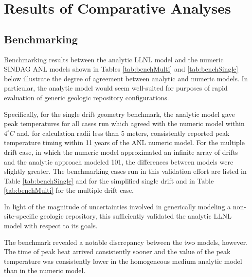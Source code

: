 \documentclass{article}
\begin{document}
\section{Results of Comparative Analyses}

\subsection{Benchmarking}

Benchmarking results between the analytic \gls{LLNL} model and the numeric 
\gls{SINDAG} \gls{ANL} models shown in Tables \ref{tab:benchMulti} and 
\ref{tab:benchSingle} below illustrate the degree of agreement between analytic 
and numeric models. In particular, the analytic model would seem well-suited for 
purposes of rapid evaluation of generic geologic repository configurations. 

Specifically, for the single drift geometry benchmark, the 
analytic model gave peak temperatures for all cases run which agreed with the 
numeric model within $4^{\circ}C$ and, for calculation radii less than 5 meters, 
consistently reported peak temperature timing within 11 years of the \gls{ANL} 
numeric model. For the multiple drift case, in which the numeric model 
approximated an infinite array of drifts and the analytic approach modeled 101, 
the differences between models were slightly greater. The benchmarking cases run 
in this validation effort are listed in Table \ref{tab:benchSingle} and for the 
simplified single drift and in Table \ref{tab:benchMulti} for the multiple drift 
case.

In light of the magnitude of uncertainties involved in generically 
modeling a non-site-specific geologic repository, this sufficiently validated 
the analytic \gls{LLNL} model with respect to its goals.

The benchmark revealed a notable discrepancy between the two models, 
however. The time of peak heat arrived consistently sooner and the value of the 
peak temperature was consistently lower in the homogeneous medium analytic
model than in the numeric model. 
\end{document}
